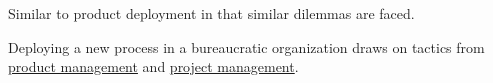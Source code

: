 Similar to product deployment in that similar dilemmas are faced.

Deploying a new process in a bureaucratic organization draws on tactics from 
\href{https://en.wikipedia.org/wiki/Product_management}{product management} and
\href{https://en.wikipedia.org/wiki/Project_management}{project management}. 